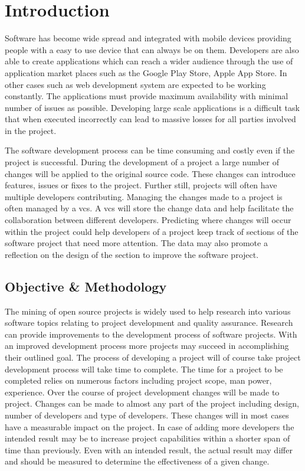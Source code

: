 \chapter{Introduction}
\label{chap:introduction}

Software has become wide spread and integrated with mobile devices providing people with a easy to use device that can always be on them. Developers are also able to create applications which can reach a wider audience through the use of application market places such as the Google Play Store, Apple App Store. In other cases such as web development system are expected to be working constantly. The applications must provide maximum availability with minimal number of issues as possible. Developing large scale applications is a difficult task that when executed incorrectly can lead to massive losses for all parties involved in the project. 

The software development process can be time consuming and costly even if the project is successful. During the development of a project a large number of changes will be applied to the original source code. These changes can introduce features, issues or fixes to the project. Further still, projects will often have multiple developers contributing. Managing the changes made to a project is often managed by a \gls{vcs}. A \gls{vcs} will store the change data and help facilitate the collaboration between different developers. Predicting where changes will occur within the project could help developers of a project keep track of sections of the software project that need more attention. The data may also promote a reflection on the design of the section to improve the software project.

\section{Objective \& Methodology}

The mining of open source projects is widely used to help research into various software topics relating to project development and quality assurance. Research can provide improvements to the development process of software projects. With an improved development process more projects may succeed in accomplishing their outlined goal. The process of developing a project will of course take project development process will take time to complete. The time for a project to be completed relies on numerous factors including project scope, man power, experience. Over the course of project development changes will be made to project. Changes can be made to almost any part of the project including design, number of developers and type of developers. These changes will in most cases have a measurable impact on the project. In case of adding more developers the intended result may be to increase project capabilities within a shorter span of time than previously. Even with an intended result, the actual result may differ and should be measured to determine the effectiveness of a given change.

